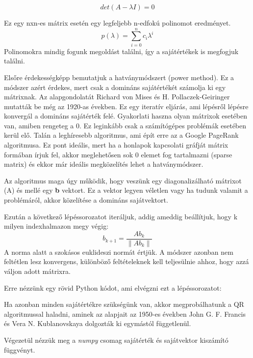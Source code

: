 \documentclass{article}
\theoremstyle{definition}
\theoremstyle{theorem}
\begin{document}
\begin{equation*}
    det(A-\lambda I) = 0
\end{equation*}

Ez egy nxn-es mátrix esetén egy legfeljebb n-edfokú polinomot eredményet.
\begin{equation*}
    p(\lambda) = \sum_{i=0}^{n} c_i \lambda^i
\end{equation*}
Polinomokra mindig fogunk megoldást találni, így a sajátértékek is megfogjuk találni.

Elsőre  érdekességképp bemutatjuk a hatványmódszert (power method). Ez a módszer azért érdekes, mert csak a domináns sajátértékét számolja ki egy mátrixnak. Az alapgondolatát Richard von Mises és H. Pollaczek-Geiringer mutatták be még az 1920-as években. Ez egy iteratív eljárás, ami lépésről lépésre konvergál a domináns sajátérték felé. Gyakorlati haszna olyan mátrixok esetében van, amiben rengeteg a 0. Ez leginkább csak a számítógépes problémák esetében kerül elő. Talán a leghíresebb algoritmus, ami épít erre az a Google PageRank algoritmusa. Ez pont ideális, mert ha a honlapok kapcsolati gráfját mátrix formában írjuk fel, akkor meglehetősen sok 0 elemet fog tartalmazni (sparse matrix) és ekkor már ideális megközelítés lehet a hatványmódszer.

Az algoritmus maga úgy működik, hogy veszünk egy diagonalizálható mátrixot (A) és mellé egy \textbf{b} vektort. Ez a vektor legyen véletlen vagy ha tudunk valamit a problémáról, akkor közelítése a domináns sajátvektort.

Ezután a következő lépéssorozatot iteráljuk, addig ameddig beállítjuk, hogy k milyen indexhalmazon megy végig:
\begin{equation*}
    b_{k+1} =\frac{A b_{k}}{\lVert A b_{k} \rVert}
\end{equation*}
A norma alatt a szokásos euklideszi normát értjük. A módszer azonban nem feltétlen lesz konvergens, különböző feltételeknek kell teljesülnie ahhoz, hogy azzá váljon adott mátrixra.

Erre nézzünk egy rövid Python kódot, ami elvégzni ezt a lépéssorozatot:
\pagebreak


Ha azonban minden sajátértékre szükségünk van, akkor megprobálhatunk a QR algoritmussal haladni, aminek az alapjait az 1950-es években John G. F. Francis és Vera N. Kublanovskaya dolgozták ki egymástól függetlenül.

Végezetül nézzük meg a \textit{numpy} csomag sajátérték és sajátvektor kiszámító függvényt.
\end{document}
